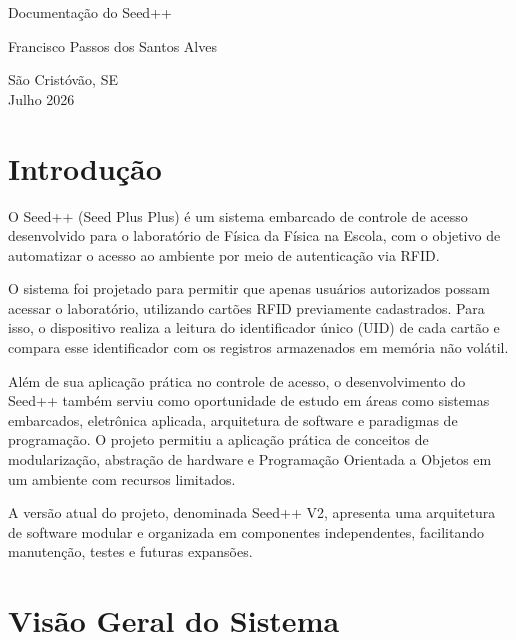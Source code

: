 \documentclass[a4paper,12pt]{article}
\begin{document}
\begin{titlepage}
    \centering

    \vspace*{5cm}
    
    {\LARGE Documentação do Seed++\par}

    \vspace{2cm}

    {\Large Francisco Passos dos Santos Alves\par}

    \vfill

    São Cristóvão, SE \\
    Julho 2026
\end{titlepage}

\clearpage
{}

\tableofcontents
\newpage

\section{Introdução}

O Seed++ (Seed Plus Plus) é um sistema embarcado de controle de acesso desenvolvido para o laboratório de Física da Física na Escola, com o objetivo de automatizar o acesso ao ambiente por meio de autenticação via RFID.

O sistema foi projetado para permitir que apenas usuários autorizados possam acessar o laboratório, utilizando cartões RFID previamente cadastrados. Para isso, o dispositivo realiza a leitura do identificador único (UID) de cada cartão e compara esse identificador com os registros armazenados em memória não volátil.

Além de sua aplicação prática no controle de acesso, o desenvolvimento do Seed++ também serviu como oportunidade de estudo em áreas como sistemas embarcados, eletrônica aplicada, arquitetura de software e paradigmas de programação. O projeto permitiu a aplicação prática de conceitos de modularização, abstração de hardware e Programação Orientada a Objetos em um ambiente com recursos limitados.

A versão atual do projeto, denominada Seed++ V2, apresenta uma arquitetura de software modular e organizada em componentes independentes, facilitando manutenção, testes e futuras expansões.

\section{Visão Geral do Sistema}
\end{document}
